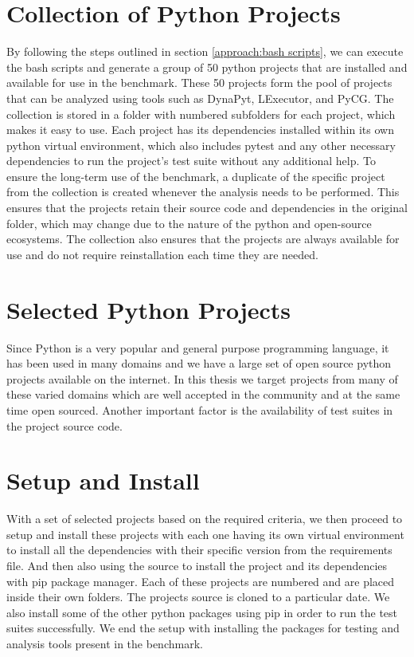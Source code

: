 \section{Collection of Python Projects}
\label{approach:collection of projects}
By following the steps outlined in section \ref{approach:bash scripts}, we can execute the bash scripts and generate a group of 50 python projects that are installed and available for use in the benchmark. These 50 projects form the pool of projects that can be analyzed using tools such as DynaPyt, LExecutor, and PyCG. The collection is stored in a folder with numbered subfolders for each project, which makes it easy to use. Each project has its dependencies installed within its own python virtual environment, which also includes pytest and any other necessary dependencies to run the project's test suite without any additional help. To ensure the long-term use of the benchmark, a duplicate of the specific project from the collection is created whenever the analysis needs to be performed. This ensures that the projects retain their source code and dependencies in the original folder, which may change due to the nature of the python and open-source ecosystems. The collection also ensures that the projects are always available for use and do not require reinstallation each time they are needed.

\section{Selected Python Projects}
\label{approach:selection of projects}
Since Python is a very popular and general purpose programming language, it has been used in many domains and we have a large set of open source python projects available on the internet. In this thesis we target projects from many of these varied domains which are well accepted in the community and at the same time open sourced. Another important factor is the availability of test suites in the project source code. 

\section{Setup and Install}
\label{approach:setup and install}
With a set of selected projects based on the required criteria, we then proceed to setup and install these projects with each one having its own virtual environment to install all the dependencies with their specific version from the requirements file. And then also using the source to install the project and its dependencies with pip package manager. Each of these projects are numbered and are placed inside their own folders. The projects source is cloned to a particular date. We also install some of the other python packages using pip in order to run the test suites successfully. We end the setup with installing the packages for testing and analysis tools present in the benchmark.

